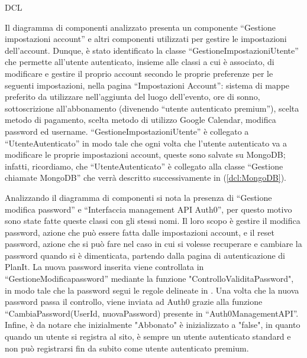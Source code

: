 \begin{listaPersonale}{DCL}

    Il diagramma di componenti analizzato presenta un componente “Gestione impostazioni account” e altri componenti utilizzati per gestire le impostazioni dell'account. Dunque, è stato identificato la classe “GestioneImpostazioniUtente” che permette all'utente autenticato, insieme alle classi a cui è associato, di modificare e gestire il proprio account secondo le proprie preferenze per le seguenti impostazioni, nella pagina “Impostazioni Account”: sistema di mappe preferito da utilizzare nell'aggiunta del luogo dell'evento, ore di sonno, sottoscrizione all'abbonamento (divenendo “utente autenticato premium”), scelta metodo di pagamento, scelta metodo di utilizzo Google Calendar, modifica password ed username.
    “GestioneImpostazioniUtente” è collegato a “UtenteAutenticato” in modo tale che ogni volta che l'utente autenticato va a modificare le proprie impostazioni account, queste sono salvate su MongoDB; infatti, ricordiamo, che “UtenteAutenticato” è collegato alla classe “Gestione chiamate MongoDB” che verrà descritto successivamente in (\ref{dcl:MongoDB}).


    \begin{center}
        
    \end{center}
    \newpage


    \begin{listaPersonale2}[DCL]{}

        Analizzando il diagramma di componenti si nota la presenza di “Gestione modifica password” e “Interfaccia management API Auth0”, per questo motivo sono state fatte queste classi con gli stessi nomi. Il loro scopo è gestire il modifica password, azione che può essere fatta dalle impostazioni account, e il reset password, azione che si può fare nel caso in cui si volesse recuperare e cambiare la password quando si è dimenticata, partendo dalla pagina di autenticazione di PlanIt. La nuova password inserita viene controllata in “GestioneModificapassword” mediante la funzione "ControlloValiditaPassword", in modo tale che la password segui le regole delineate in . Una volta che la nuova password passa il controllo, viene inviata ad Auth0 grazie alla funzione “CambiaPassword(UserId, nuovaPassword) presente in “Auth0ManagementAPI”.
        Infine, è da notare che inizialmente "Abbonato" è inizializzato a "false", in quanto quando un utente si registra al sito, è sempre un utente autenticato standard e non può registrarsi fin da subito come utente autenticato premium.


\end{listaPersonale2}
\end{listaPersonale}
